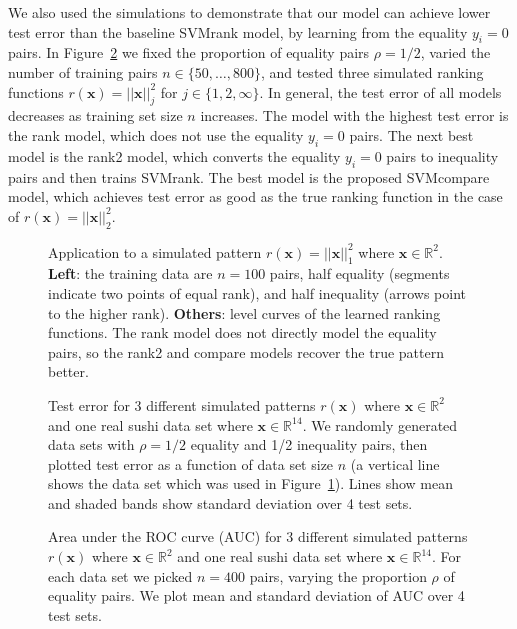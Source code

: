 \documentclass[twoside,11pt]{article}
\newcommand{\RR}{\mathbb R}
\begin{document}
We also used the simulations to demonstrate that our model can achieve
lower test error than the baseline SVMrank model, by learning from the
equality $y_i=0$ pairs. In Figure~\ref{fig:simulation-samples} we
fixed the proportion of equality pairs $\rho=1/2$, varied the number
of training pairs $n\in\{50,\dots, 800\}$, and tested three simulated
ranking functions $r(\mathbf x)=||\mathbf x||^2_j$ for
$j\in\{1,2,\infty\}$. In general, the test error of all models
decreases as training set size $n$ increases. The model with the
highest test error is the rank model, which does not use the equality
$y_i=0$ pairs. The next best model is the rank2 model, which converts
the equality $y_i=0$ pairs to inequality pairs and then trains
SVMrank. The best model is the proposed SVMcompare model, which
achieves test error as good as the true ranking function in the case
of $r(\mathbf x)=||\mathbf x||^2_2$.

\begin{figure}[b!]
  \centering
  
  \vskip -1cm
  \caption{Application to a simulated pattern $r(\mathbf x)=||\mathbf
    x||_1^2$ where $\mathbf x\in\RR^2$. \textbf{Left}: the training
    data are $n=100$ pairs, half equality (segments indicate two
    points of equal rank), and half inequality (arrows point to the
    higher rank). \textbf{Others}: level curves of the learned ranking
    functions. The rank model does not directly model the equality
    pairs, so the rank2 and compare models recover the true pattern
    better.}
  \label{fig:norm-level-curves}
\end{figure}

\begin{figure}[b!]
  
  \vskip -1cm
  \caption{Test error for 3 different simulated patterns $r(\mathbf
    x)$ where $\mathbf x\in\RR^2$ and one real
    sushi data set where $\mathbf x\in\RR^{14}$. We randomly generated data sets
    with $\rho=1/2$ equality and 1/2 inequality pairs, then plotted test
    error as a function of data set size $n$ (a vertical line
    shows the data set which was used in
    Figure~\ref{fig:norm-level-curves}). Lines show mean and shaded
    bands show standard deviation over 4 test sets.}
  \label{fig:simulation-samples}
\end{figure}

\begin{figure}[!ht]
  
  \vskip -1cm
  \caption{Area under the ROC curve (AUC) for 3 different simulated
    patterns $r(\mathbf x)$ where $\mathbf x\in\RR^2$ and one real
    sushi data set where $\mathbf x\in\RR^{14}$. For each data set we
    picked $n=400$ pairs, varying the proportion $\rho$ of equality
    pairs. We plot mean and standard deviation of AUC over 4 test
    sets.}
  \label{fig:auc}
\end{figure}
\end{document}
